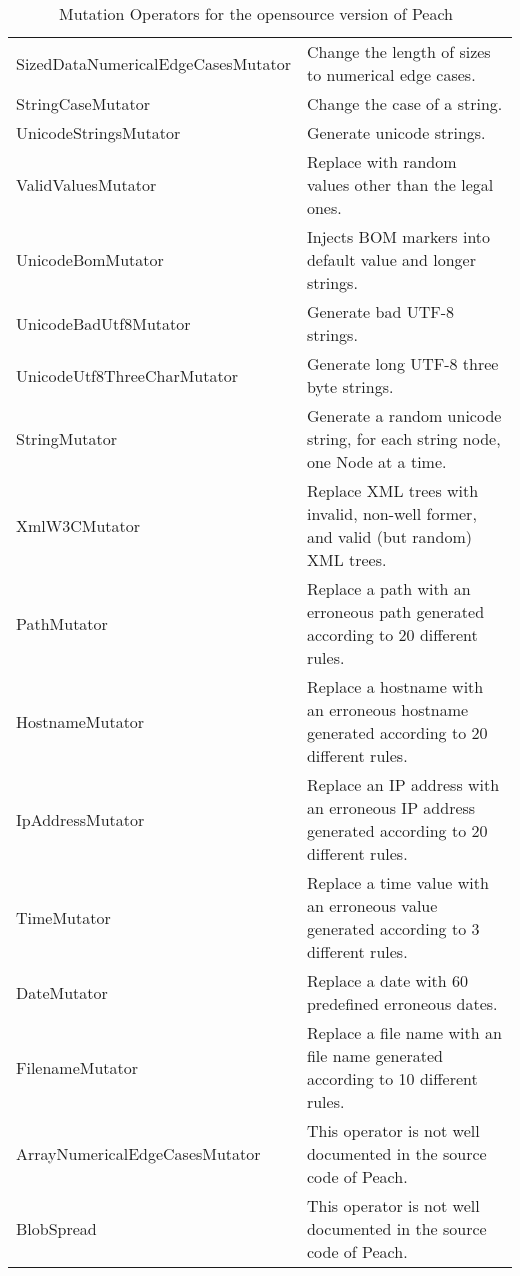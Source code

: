 \begin{table}[h]
\begin{center}
{\begin{tabular}{|p{5cm}|p{9cm}|}
SizedDataNumericalEdgeCasesMutator&Change the length of sizes to numerical edge cases.\\
StringCaseMutator&Change the case of a string.\\
UnicodeStringsMutator&Generate unicode strings.\\
ValidValuesMutator&Replace with random values other than the legal ones.\\
UnicodeBomMutator&Injects BOM markers into default value and longer strings.\\
UnicodeBadUtf8Mutator&Generate bad UTF-8 strings.\\
UnicodeUtf8ThreeCharMutator&Generate long UTF-8 three byte strings.\\
StringMutator&Generate a random unicode string, for each string node, one Node at a time.\\
XmlW3CMutator&Replace XML trees with invalid, non-well former, and valid (but random) XML trees.\\
PathMutator&Replace a path with an erroneous path generated according to 20 different rules.\\
HostnameMutator&Replace a hostname with an erroneous hostname generated according to 20 different rules.\\
IpAddressMutator&Replace an IP address with an erroneous IP address generated according to 20 different rules.\\
TimeMutator&Replace a time value with an erroneous value generated according to 3 different rules.\\
DateMutator&Replace a date with 60 predefined erroneous dates.\\ 
FilenameMutator&Replace a file name with an file name generated according to 10 different rules.\\
ArrayNumericalEdgeCasesMutator&This operator is not well documented in the source code of Peach.\\
BlobSpread&This operator is not well documented in the source code of Peach.\\
\hline
\end{tabular}
}
\end{center}
\caption{Mutation Operators for the opensource version of Peach~\cite{PeachMozilla}}
\label{table:PeachOperators}
\end{table}%